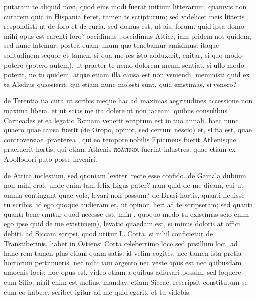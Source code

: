 


 putaram te aliquid novi, quod eius modi fuerat initium litterarum, quamvis non curarem quid in Hispania fieret, tamen te scripturum; sed videlicet meis litteris respondisti ut de foro et de curia. sed domus est, ut ais, forum. quid ipsa domo mihi opus est carenti foro? occidimus , occidimus Attice, iam pridem nos quidem, sed nunc fatemur, postea quam unum quo tenebamur amisimus. itaque solitudinem sequor et tamen, si qua me res isto adduxerit, enitar, si quo modo potero (potero autem), ut praeter te nemo dolorem meum sentiat, si ullo modo poterit, ne tu quidem. atque etiam illa causa est non veniendi. meministi quid ex te Aledius quaesierit. qui etiam nunc molesti sunt, quid existimas, si venero?

 de Terentia ita cura ut scribis meque hac ad maximas aegritudines accessione non maxima libera. et ut scias me ita dolere ut non iaceam, quibus consulibus Carneades et ea legatio Romam venerit scriptum est in tuo annali. haec nunc quaero quae causa fuerit (de Oropo, opinor, sed certum nescio) et, si ita est, quae controversiae. praeterea , qui eo tempore nobilis Epicureus fuerit Athenisque praefuerit hortis, qui etiam Athenis πολιτικοὶ fuerint inlustres. quae etiam ex Apollodori puto posse inveniri.

 de Attica molestum, sed quoniam leviter, recte esse confido. de Gamala dubium non mihi erat. unde enim tam felix Ligus pater? nam quid de me dicam, cui ut omnia contingant quae volo, levari non possum? de Drusi hortis, quanti licuisse tu scribis, id ego quoque audieram et, ut opinor, heri ad te scripseram; sed quanti quanti bene emitur quod necesse est. mihi , quoquo modo tu existimas scio enim ego ipse quid de me existimem), levatio quaedam est, si minus doloris at offici debiti. ad Siccam scripsi, quod utitur L. Cotta. si nihil conficietur de Transtiberinis, habet in Ostiensi Cotta celeberrimo loco sed pusillum loci, ad hanc rem tamen plus etiam quam satis. id velim cogites. nec tamen ista pretia hortorum pertimueris. nec mihi iam argento nec veste opus est nec quibusdam amoenis locis; hoc opus est. video etiam a quibus adiuvari possim. sed loquere cum Silio; nihil enim est melius. mandavi etiam Siccae. rescripsit constitutum se cum eo habere. scribet igitur ad me quid egerit, et tu videbis.

